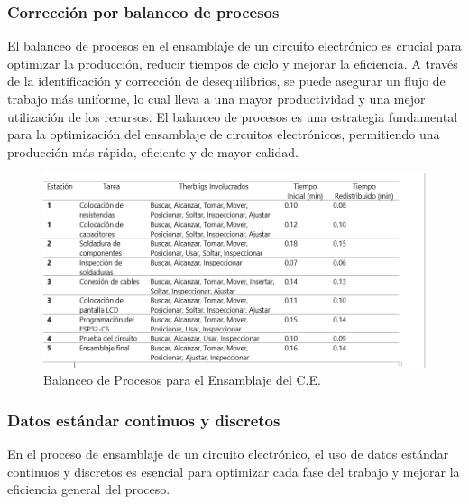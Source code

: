     \subsubsection{Corrección por balanceo de procesos}
    
    El balanceo de procesos en el ensamblaje de un circuito electrónico es crucial para optimizar la producción, reducir tiempos de ciclo y mejorar la eficiencia. A través de la identificación y corrección de desequilibrios, se puede asegurar un flujo de trabajo más uniforme, lo cual lleva a una mayor productividad y una mejor utilización de los recursos.
    El balanceo de procesos es una estrategia fundamental para la optimización del ensamblaje de circuitos electrónicos, permitiendo una producción más rápida, eficiente y de mayor calidad.\cite{Niebel}
    
    \begin{figure}[H]
        \centering
        \includegraphics[scale=0.30]{1/img/Balanceo de Procesos para el Ensamblaje del C.E..png}
        \caption{Balanceo de Procesos para el Ensamblaje del C.E.}
    \end{figure}
    \subsubsection{Datos estándar continuos y discretos}
    En el proceso de ensamblaje de un circuito electrónico, el uso de datos estándar continuos y discretos es esencial para optimizar cada fase del trabajo y mejorar la eficiencia general del proceso.
    
